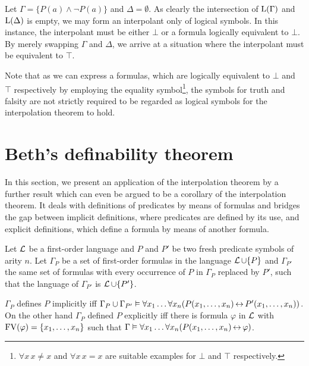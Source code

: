 \begin{exa}
	Let $\Gamma = \{ P(a) \land \lnot P(a) \} $ and $\Delta = \emptyset$.
	As clearly the intersection of $\operatorname{L}(\Gamma)$ and $\operatorname{L}(\Delta)$ is empty, we may form an interpolant only of logical symbols.
	In this instance, the interpolant must be either $\bot$ or a formula logically equivalent to $\bot$.
	By merely swapping $\Gamma$ and $\Delta$, we arrive at a situation where the interpolant must be equivalent to $\top$.

	Note that as we can express a formulas, which are logically equivalent to $\bot$ and $\top$ respectively by employing the equality symbol\footnote{$\forall x\,x\neq x$ and $\forall x\,x=x$ are suitable examples for $\bot$ and $\top$ respectively.}, the symbols for truth and falsity are not strictly required to be regarded as logical symbols for the interpolation theorem to hold.
\end{exa}


\section{Beth's definability theorem}
\label{sec:beth}

In this section, we present an application of the interpolation theorem by a further result which can even be argued to be a corollary of the interpolation theorem. 
It deals with definitions of predicates by means of formulas and bridges the gap between implicit definitions, where predicates are defined by its use, and explicit definitions, which define a formula by means of another formula.

\begin{defi}
	Let $\operatorname{\mathcal{L}}$ be a first-order language and
	$P$ and $P'$ be two fresh predicate symbols of arity $n$.
	Let $\Gamma_P$ be a set of first-order formulas
	in the language $\operatorname{\mathcal{L}}\cup\{P\}$ 
	and $\Gamma_{P'}$ the same set of formulas with every occurrence of $P$ in $\Gamma_P$ replaced by\nolinebreak{} $P'$, such that the language of $\Gamma_{P'}$ is $\operatorname{\mathcal{L}} \cup\{P'\}$.

	$\Gamma_P$ defines $P$ implicitly iff $\Gamma_P \cup \Gamma_{P'} \vDash \forall x_1\dots \forall x_n (  P(x_1, \dots, x_n) \operatorname{\leftrightarrow} P'(x_1, \dots, x_n))$.
	On the other hand $\Gamma_P$ defined $P$ explicitly iff there is formula $\varphi$ in $\operatorname{\mathcal{L}}$ with $\operatorname{FV}(\varphi) = \{x_1, \dots, x_n\}$ such that 
	$\Gamma\vDash \forall x_1\dots \forall x_n (  P(x_1, \dots, x_n) \operatorname{\leftrightarrow} \varphi)$.
\end{defi}

